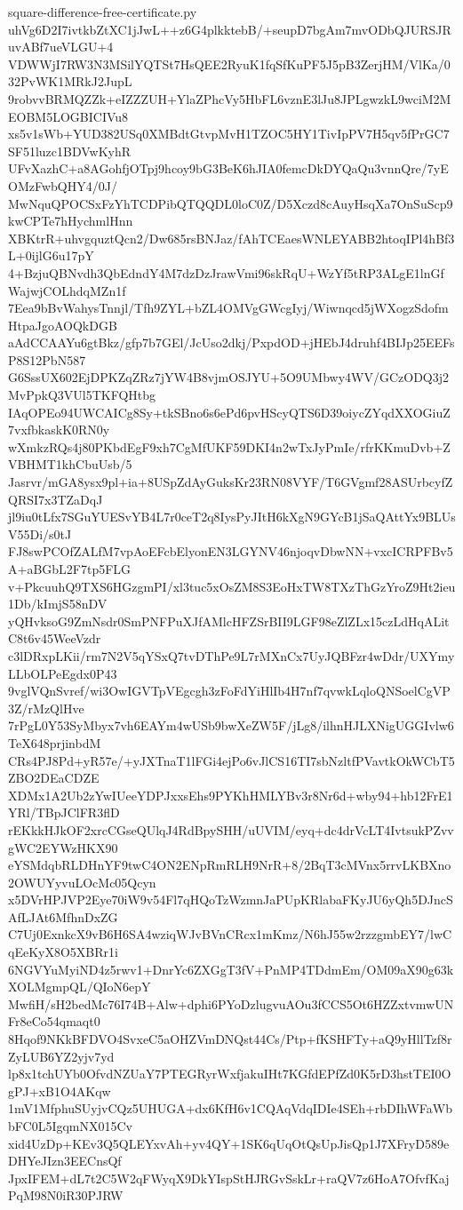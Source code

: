 \documentclass[11pt]{article}
\theoremstyle{definition}
\theoremstyle{remark}
\begin{document}
\begin{filecontents*}[overwrite]{square-difference-free-certificate.py}
uhVg6D2I7ivtkbZtXC1jJwL++z6G4plkktebB/+seupD7bgAm7mvODbQJURSJRuvABf7ueVLGU+4
VDWWjI7RW3N3MSilYQTSt7HsQEE2RyuK1fqSfKuPF5J5pB3ZerjHM/VlKa/032PvWK1MRkJ2JupL
9robvvBRMQZZk+eIZZZUH+YlaZPhcVy5HbFL6vznE3lJu8JPLgwzkL9wciM2MEOBM5LOGBICIVu8
xs5v1sWb+YUD382USq0XMBdtGtvpMvH1TZOC5HY1TivIpPV7H5qv5fPrGC7SF51luzc1BDVwKyhR
UFvXazhC+a8AGohfjOTpj9hcoy9bG3BeK6hJIA0femcDkDYQaQu3vnnQre/7yEOMzFwbQHY4/0J/
MwNquQPOCSxFzYhTCDPibQTQQDL0loC0Z/D5Xczd8cAuyHsqXa7OnSuScp9kwCPTe7hHychmlHnn
XBKtrR+uhvgquztQcn2/Dw685rsBNJaz/fAhTCEaesWNLEYABB2htoqIPl4hBf3L+0ijlG6u17pY
4+BzjuQBNvdh3QbEdndY4M7dzDzJrawVmi96skRqU+WzYf5tRP3ALgE1lnGfWajwjCOLhdqMZn1f
7Eea9bBvWahysTnnjl/Tfh9ZYL+bZL4OMVgGWcgIyj/Wiwnqcd5jWXogzSdofmHtpaJgoAOQkDGB
aAdCCAAYu6gtBkz/gfp7b7GEl/JcUso2dkj/PxpdOD+jHEbJ4druhf4BIJp25EEFsP8S12PbN587
G6SssUX602EjDPKZqZRz7jYW4B8vjmOSJYU+5O9UMbwy4WV/GCzODQ3j2MvPpkQ3VUl5TKFQHtbg
IAqOPEo94UWCAICg8Sy+tkSBno6s6ePd6pvHScyQTS6D39oiycZYqdXXOGiuZ7vxfbkaskK0RN0y
wXmkzRQs4j80PKbdEgF9xh7CgMfUKF59DKI4n2wTxJyPmIe/rfrKKmuDvb+ZVBHMT1khCbuUsb/5
Jasrvr/mGA8ysx9pl+ia+8USpZdAyGuksKr23RN08VYF/T6GVgmf28ASUrbcyfZQRSI7x3TZaDqJ
jl9iu0tLfx7SGuYUESvYB4L7r0ceT2q8IysPyJItH6kXgN9GYcB1jSaQAttYx9BLUsV55Di/s0tJ
FJ8swPCOfZALfM7vpAoEFcbElyonEN3LGYNV46njoqvDbwNN+vxcICRPFBv5A+aBGbL2F7tp5FLG
v+PkcuuhQ9TXS6HGzgmPI/xl3tuc5xOsZM8S3EoHxTW8TXzThGzYroZ9Ht2ieu1Db/kImjS58nDV
yQHvksoG9ZmNsdr0SmPNFPuXJfAMlcHFZSrBII9LGF98eZlZLx15czLdHqALitC8t6v45WeeVzdr
c3lDRxpLKii/rm7N2V5qYSxQ7tvDThPe9L7rMXnCx7UyJQBFzr4wDdr/UXYmyLLbOLPeEgdx0P43
9vglVQnSvref/wi3OwIGVTpVEgcgh3zFoFdYiHlIb4H7nf7qvwkLqloQNSoelCgVP3Z/rMzQlHve
7rPgL0Y53SyMbyx7vh6EAYm4wUSb9bwXeZW5F/jLg8/ilhnHJLXNigUGGIvlw6TeX648prjinbdM
CRs4PJ8Pd+yR57e/+yJXTnaT1lFGi4ejPo6vJlCS16TI7sbNzltfPVavtkOkWCbT5ZBO2DEaCDZE
XDMx1A2Ub2zYwIUeeYDPJxxsEhs9PYKhHMLYBv3r8Nr6d+wby94+hb12FrE1YRl/TBpJClFR3flD
rEKkkHJkOF2xrcCGseQUlqJ4RdBpySHH/uUVIM/eyq+dc4drVcLT4IvtsukPZvvgWC2EYWzHKX90
eYSMdqbRLDHnYF9twC4ON2ENpRmRLH9NrR+8/2BqT3cMVnx5rrvLKBXno2OWUYyvuLOcMc05Qcyn
x5DVrHPJVP2Eye70iW9v54Fl7qHQoTzWzmnJaPUpKRlabaFKyJU6yQh5DJncSAfLJAt6MfhnDxZG
C7Uj0ExnkcX9vB6H6SA4wziqWJvBVnCRcx1mKmz/N6hJ55w2rzzgmbEY7/lwCqEeKyX8O5XBRr1i
6NGVYuMyiND4z5rwv1+DnrYc6ZXGgT3fV+PnMP4TDdmEm/OM09aX90g63kXOLMgmpQL/QIoN6epY
MwfiH/sH2bedMc76I74B+Alw+dphi6PYoDzlugvuAOu3fCCS5Ot6HZZxtvmwUNFr8eCo54qmaqt0
8Hqof9NKkBFDVO4SvxeC5aOHZVmDNQst44Cs/Ptp+fKSHFTy+aQ9yHllTzf8rZyLUB6YZ2yjv7yd
lp8x1tchUYb0OfvdNZUaY7PTEGRyrWxfjakuIHt7KGfdEPfZd0K5rD3hstTEI0OgPJ+xB1O4AKqw
1mV1MfphuSUyjvCQz5UHUGA+dx6KfH6v1CQAqVdqIDIe4SEh+rbDIhWFaWbbFC0L5IgqmNX015Cv
xid4UzDp+KEv3Q5QLEYxvAh+yv4QY+1SK6qUqOtQsUpJisQp1J7XFryD589eDHYeJIzn3EECnsQf
JpxIFEM+dL7t2C5W2qFWyqX9DkYIspStHJRGvSskLr+raQV7z6HoA7OfvfKajPqM98N0iR30PJRW

\end{filecontents*}
\end{document}
